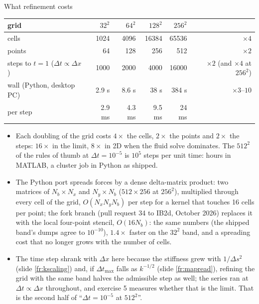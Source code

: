 \documentclass[aspectratio=169,11pt]{beamer}
\begin{document}
\begin{frame}{What refinement costs}
\label{fr:cost}
\footnotesize
\begin{center}
\scriptsize
\begin{tabular}{@{}lrrrrr@{}}
\toprule
grid & $32^2$ & $64^2$ & $128^2$ & $256^2$ & \\
\midrule
cells & 1024 & 4096 & 16384 & 65536 & $\times 4$ \\
points & 64 & 128 & 256 & 512 & $\times 2$ \\
steps to $t = 1$ ($\Delta t \propto \Delta x$) & 1000 & 2000 & 4000 & 16000 & $\times 2$ (and $\times 4$ at $256^2$) \\
wall (Python, desktop PC) & 2.9 s & 8.6 s & 38 s & 384 s & $\times 3$--$10$ \\
per step & 2.9 ms & 4.3 ms & 9.5 ms & 24 ms & \\
\bottomrule
\end{tabular}
\end{center}
\begin{itemize}
  \item Each doubling of the grid costs $4\times$ the cells, $2\times$ the points and $2\times$ the steps: $16\times$ in the limit, $8\times$ in 2D when the fluid solve dominates. The $512^2$ of the rules of thumb at $\Delta t = 10^{-5}$ is $10^5$ steps per unit time: hours in MATLAB, a cluster job in Python as shipped.
  \item The Python port spreads forces by a dense delta-matrix product: two matrices of $N_b \times N_x$ and $N_y \times N_b$ ($512 \times 256$ at $256^2$), multiplied through every cell of the grid, $O(N_x N_y N_b)$ per step for a kernel that touches 16 cells per point; the fork branch  (pull request 34 to IB2d, October 2026) replaces it with the local four-point stencil, $O(16 N_b)$: the same numbers (the shipped band's dumps agree to $10^{-10}$), $1.4\times$ faster on the $32^2$ band, and a spreading cost that no longer grows with the number of cells.
  \item The time step shrank with $\Delta x$ here because the stiffness grew with $1/\Delta s^2$ (slide \ref{fr:kscaling}) and, if $\Delta t_{\max}$ falls as $k^{-1/2}$ (slide \ref{fr:mapread}), refining the grid with the same band halves the admissible step as well; the series ran at $\Delta t \propto \Delta x$ throughout, and exercise 5 measures whether that is the limit. That is the second half of ``$\Delta t = 10^{-5}$ at $512^2$''.
\end{itemize}
\end{frame}
\end{document}
